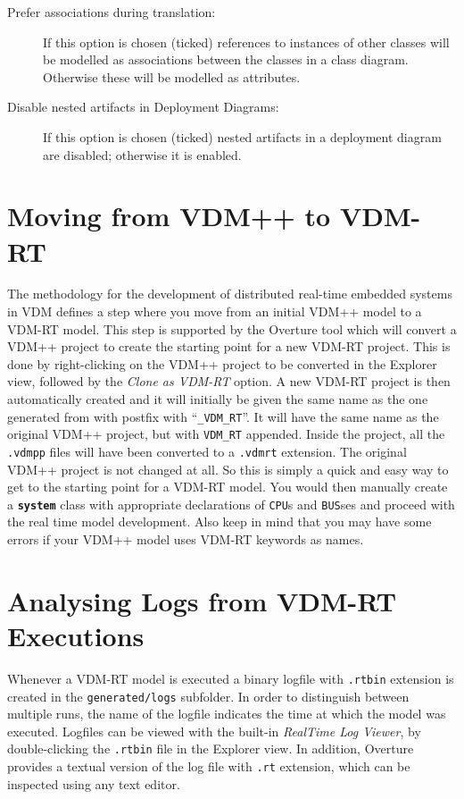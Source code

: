 \documentclass{overturerepchap}
\begin{document}
\begin{description}
\item[Prefer associations during translation:] If this option is chosen 
(ticked) references to instances of other classes will be modelled as
associations between the classes in a class diagram. Otherwise these will be 
modelled as attributes.
\item[Disable nested artifacts in Deployment Diagrams:] If this option
is chosen (ticked) nested artifacts in a deployment diagram are disabled; 
otherwise it is enabled.
\end{description}

\chapter{Moving from VDM++ to VDM-RT}\label{sec:ToVDMRT}

The methodology for the development of distributed real-time
embedded systems in VDM defines a step where you
move from an initial VDM++ model to a VDM-RT model\cite{Larsen&09b}. This
step is supported by the Overture tool which will convert
a VDM++ project to create the starting point for a new VDM-RT
project. This is done by right-clicking on the VDM++ project to be
converted in the Explorer view, followed by
the \emph{Clone as VDM-RT} option. A new VDM-RT project is then automatically
created and it will initially be given the same name as the one generated from 
with postfix with ``\texttt{\_VDM\_RT}''. It will have the
same name as the original VDM++ project, but with \texttt{VDM\_RT} appended.
Inside the project, all the \texttt{.vdmpp} files will have been converted
to a \texttt{.vdmrt} extension. The original VDM++ project is not
changed at all. So this is simply a quick and easy way to get to the
starting point for a VDM-RT model. You would then manually create
a {\textbf\texttt{system}} class with appropriate declarations of
\texttt{CPU}s and \texttt{BUS}ses and proceed with the real time
model development. Also keep in mind that you may have some errors
if your VDM++ model uses VDM-RT keywords as names.

\chapter{Analysing Logs from VDM-RT Executions}\label{sec:showlog}

Whenever a VDM-RT model is executed a binary logfile with \texttt{.rtbin} extension
is created in the \texttt{generated/logs} subfolder. In order to distinguish between multiple runs,
the name of the logfile indicates the time at which the model was executed. Logfiles can be
viewed with the built-in \emph{RealTime Log Viewer},
by double-clicking the \texttt{.rtbin} file in the Explorer view. In addition, Overture provides
a textual version of the log file with \texttt{.rt} extension,
which can be inspected using any text editor.
\end{document}
